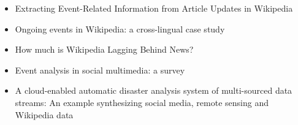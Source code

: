 \begin{itemize}
\item Extracting Event-Related Information from Article Updates in Wikipedia \cite{10.1007978-3-642-36973-5_22}
\item Ongoing events in Wikipedia: a cross-lingual case study \cite{gottschalk2017ongoing}
\item How much is Wikipedia Lagging Behind News? \cite{fetahu2015much}
\item Event analysis in social multimedia: a survey \cite{liu2016event}
\item A cloud-enabled automatic disaster analysis system of multi-sourced data streams: An example synthesizing social media, remote sensing and Wikipedia data \cite{huang2017cloud}
\end{itemize}



